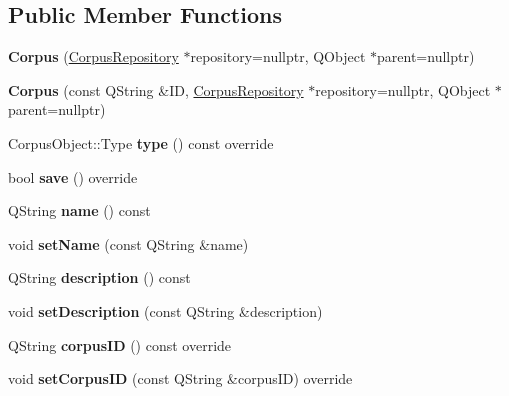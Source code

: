 \subsection*{Public Member Functions}
\begin{DoxyCompactItemize}
\item 
\mbox{\label{class_corpus_a425510e7043059892721f9e277f67e21}} 
{\bfseries Corpus} (\hyperlink{class_corpus_repository}{Corpus\+Repository} $\ast$repository=nullptr, Q\+Object $\ast$parent=nullptr)
\item 
\mbox{\label{class_corpus_acd2fb05316e98fe719db3e393155168c}} 
{\bfseries Corpus} (const Q\+String \&ID, \hyperlink{class_corpus_repository}{Corpus\+Repository} $\ast$repository=nullptr, Q\+Object $\ast$parent=nullptr)
\item 
\mbox{\label{class_corpus_a4ca235852ae565699aa6f94574c6ed08}} 
Corpus\+Object\+::\+Type {\bfseries type} () const override
\item 
\mbox{\label{class_corpus_ac1a90bbf167ae15bb9e60f763b7613c4}} 
bool {\bfseries save} () override
\item 
\mbox{\label{class_corpus_aace59ec0a90b8e0dc38baf8503403ea8}} 
Q\+String {\bfseries name} () const
\item 
\mbox{\label{class_corpus_a7ec330802b109beac27c3563d36d20b6}} 
void {\bfseries set\+Name} (const Q\+String \&name)
\item 
\mbox{\label{class_corpus_a56289ebc4858576a1f61718b1682c020}} 
Q\+String {\bfseries description} () const
\item 
\mbox{\label{class_corpus_a450f7f3e3ce0437d250d3f68bbd49878}} 
void {\bfseries set\+Description} (const Q\+String \&description)
\item 
\mbox{\label{class_corpus_a4bac5617957f76e1c621292ad4de507e}} 
Q\+String {\bfseries corpus\+ID} () const override
\item 
\mbox{\label{class_corpus_a6683210f37ceae87bd37515e8cdcf996}} 
void {\bfseries set\+Corpus\+ID} (const Q\+String \&corpus\+ID) override

\end{DoxyCompactItemize}
